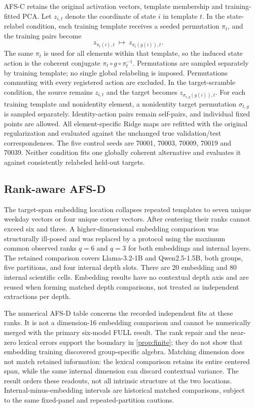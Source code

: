 AFS-C retains the original activation vectors, template membership and training-fitted PCA. Let $z_{i,t}$ denote the coordinate of state $i$ in template $t$. In the state-relabel condition, each training template receives a seeded permutation $\pi_t$, and the training pairs become
\[
 z_{\pi_t(i),t}\ \longmapsto\ z_{\pi_t(g(i)),t}.
\]
The same $\pi_t$ is used for all elements within that template, so the induced state action is the coherent conjugate $\pi_t\circ g\circ\pi_t^{-1}$. Permutations are sampled separately by training template; no single global relabeling is imposed. Permutations commuting with every registered action are excluded. In the target-scramble condition, the source remains $z_{i,t}$ and the target becomes $z_{\sigma_{t,g}(g(i)),t}$. For each training template and nonidentity element, a nonidentity target permutation $\sigma_{t,g}$ is sampled separately. Identity-action pairs remain self-pairs, and individual fixed points are allowed. All element-specific Ridge maps are refitted with the original regularization and evaluated against the unchanged true validation/test correspondences. The five control seeds are 70001, 70003, 70009, 70019 and 70039. Neither condition fits one globally coherent alternative and evaluates it against consistently relabeled held-out targets.

\subsection{Rank-aware AFS-D}
The target-span embedding location collapses repeated templates to seven unique weekday vectors or four unique corner vectors. After centering their ranks cannot exceed six and three. A higher-dimensional embedding comparison was structurally ill-posed and was replaced by a protocol using the maximum common observed ranks $q=6$ and $q=3$ for both embeddings and internal layers. The retained comparison covers Llama-3.2-1B and Qwen2.5-1.5B, both groups, five partitions, and four internal depth slots. There are 20 embedding and 80 internal scientific cells. Embedding results have no contextual depth axis and are reused when forming matched depth comparisons, not treated as independent extractions per depth.

The numerical AFS-D table concerns the recorded independent fits at these ranks. It is not a dimension-16 embedding comparison and cannot be numerically merged with the primary six-model FULL result. The rank repair and the near-zero lexical errors support the boundary in \cref{prop:finite}; they do not show that embedding training discovered group-specific algebra. Matching dimension does not match retained information: the lexical comparison retains its entire centered span, while the same internal dimension can discard contextual variance. The result orders these readouts, not all intrinsic structure at the two locations. Internal-minus-embedding intervals are historical matched comparisons, subject to the same fixed-panel and repeated-partition cautions.

